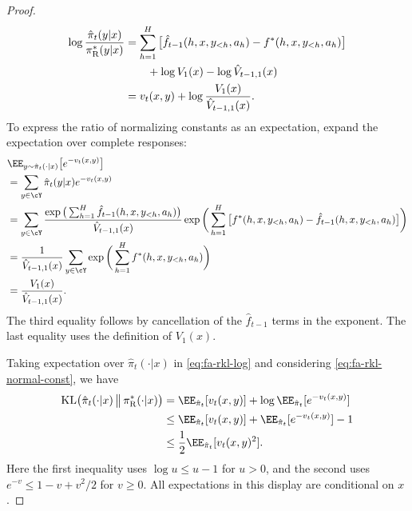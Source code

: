 \documentclass[11pt]{article}
\newcommand{\KL}{\text{KL}}
\newcommand{\pir}{\pi_{\mathrm{R}}}
\begin{document}
\begin{proof}
\begin{align}
\notag
    \log\frac{\hat\pi_t(y|x)}{\pir^*(y|x)}
    &=
    \sum_{h=1}^H
    \big[
        \hat f_{t-1}(h,x,y_{<h},a_h)
        -
        f^*(h,x,y_{<h},a_h)
    \big]\\\notag
    &\qquad+
    \log V_1(x)-\log\hat V_{t-1,1}(x)\\\label{eq:fa-rkl-log}
    &=
    v_t(x,y)
    +
    \log\frac{V_1(x)}{\hat V_{t-1,1}(x)}.
\end{align}
To express the ratio of normalizing constants as an
expectation, expand the expectation over complete responses:
\begin{align}
\notag&\EE_{y\sim\hat\pi_t(\cdot|x)}
    \big[e^{-v_t(x,y)}\big]\\\notag
    &=
    \sum_{y\in\cY}
    \hat\pi_t(y|x)e^{-v_t(x,y)}\\\notag
    &=
    \sum_{y\in\cY}
    \frac{
        \exp\big(
            \sum_{h=1}^H
            \hat f_{t-1}(h,x,y_{<h},a_h)
        \big)
    }{
        \hat V_{t-1,1}(x)
    }
    \exp\bigg(
        \sum_{h=1}^H
        \big[
            f^*(h,x,y_{<h},a_h)
            -
            \hat f_{t-1}(h,x,y_{<h},a_h)
        \big]
    \bigg)\\\notag
    &=
    \frac1{\hat V_{t-1,1}(x)}
    \sum_{y\in\cY}
    \exp\bigg(
        \sum_{h=1}^H f^*(h,x,y_{<h},a_h)
    \bigg)\\\label{eq:fa-rkl-normal-const}
    &=
    \frac{V_1(x)}{\hat V_{t-1,1}(x)}.
\end{align}
The third equality follows by cancellation of the
$\hat f_{t-1}$ terms in the exponent. The last equality uses the definition of $V_1(x)$.

Taking expectation over $\hat\pi_t(\cdot|x)$ in \eqref{eq:fa-rkl-log} and considering \eqref{eq:fa-rkl-normal-const}, we have
\begin{align}
    \KL\bigl(
        \hat\pi_t(\cdot|x)
        \,\big\|\,
        \pir^*(\cdot|x)
    \bigr)
    &=
    \EE_{\hat\pi_t}[v_t(x,y)]
    +
    \log\EE_{\hat\pi_t}[e^{-v_t(x,y)}]
    \notag\\
    &\leq
    \EE_{\hat\pi_t}[v_t(x,y)]
    +
    \EE_{\hat\pi_t}[e^{-v_t(x,y)}]-1
    \notag\\
    &\leq
    \frac12
    \EE_{\hat\pi_t}[v_t(x,y)^2].
    \label{eq:fa-rkl-proof-kl-square}
\end{align}
Here the first inequality uses $\log u\leq u-1$ for
$u>0$, and the second uses
$e^{-v}\leq1-v+v^2/2$ for $v\geq0$.
All expectations in this display are conditional on $x$.


\end{proof}
\end{document}
